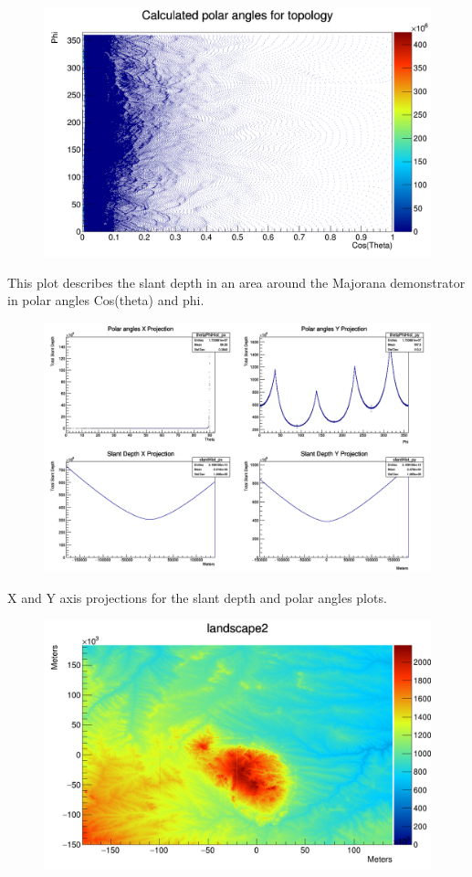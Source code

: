 \documentclass[a4paper,12pt]{article}
\begin{document}
\begin{figure}[H]
\centering
\includegraphics[scale=0.3]{polarAnglesTop2.png}
\end{figure}

This plot describes the slant depth in an area around the Majorana demonstrator in polar angles Cos(theta) and phi.

\begin{figure}[H]
\centering
\includegraphics[scale=0.3]{axisProjections.png}
\end{figure}

X and Y axis projections for the slant depth and polar angles plots.

\begin{figure}[H]
\centering
\includegraphics[scale=0.3]{Topology.png}
\end{figure}
\end{document}
